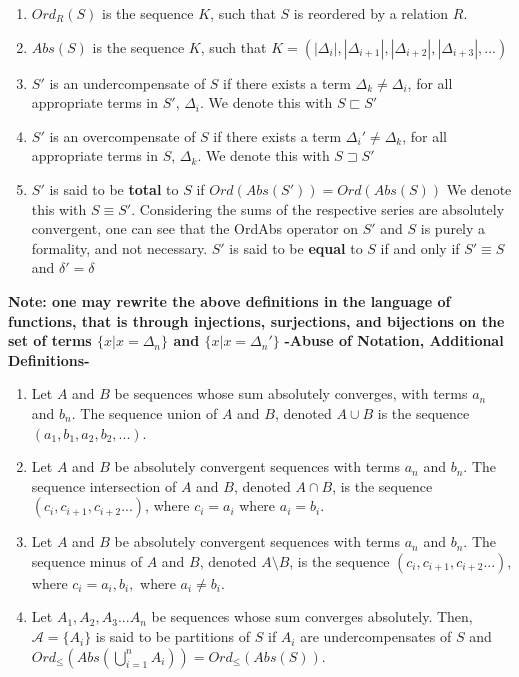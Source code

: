 \documentclass{article}
\begin{document}
\begin{enumerate}[i]
    \item $Ord_R(S)$ is the sequence $K$, such that $S$ is reordered by a relation $R$.
    \item $Abs(S)$ is the sequence $K$, such that $K = (|\Delta_i|,|\Delta_{i+1}|,|\Delta_{i+2}|,|\Delta_{i+3}|,... )$
    \item $S'$ is an undercompensate of $S$ if there exists a term $\Delta_k \neq \Delta_i$, for all appropriate terms in $S'$, 
          $\Delta_i$. We denote this with $S \sqsubset S'$
    \item $S'$ is an overcompensate of $S$ if there exists a term $\Delta_i' \neq \Delta_k$, for all appropriate terms in $S$, 
          $\Delta_k$. We denote this with $S \sqsupset S'$
    \item $S'$ is said to be \textbf{total} to $S$ if $Ord(Abs(S')) = Ord(Abs(S))$ We denote this with $S \equiv S'$. 
          Considering the sums of the respective series are absolutely convergent, one can see that the OrdAbs 
          operator on $S'$ and $S$ is purely a formality, and not necessary. $S'$ is said to be \textbf{equal} to $S$ 
          if and only if $S' \equiv S$ and $\delta' = \delta$
  \end{enumerate}
\textbf{Note:  one may rewrite the above definitions in the language of functions, that is through injections, 
surjections, and bijections on the set of terms $\{x | x = \Delta_n\}$ and $\{x | x = \Delta_n'\}$}
\newpage
\textbf{-Abuse of Notation, Additional Definitions-}
\begin{enumerate}[i]
    \item Let $A$ and $B$ be sequences whose sum absolutely converges, with terms $a_n$ and $b_n$. 
          The sequence union of $A$ and $B$, denoted $A \cup B$ is the sequence $(a_1, b_1, a_2, b_2, ...)$. 
    \item Let $A$ and $B$ be absolutely convergent sequences with terms $a_n$ and $b_n$.  
          The sequence intersection of $A$ and $B$, denoted $A \cap B$, is the sequence $(c_i, c_{i+1}, c_{i+2}...)$, 
          where $c_i = a_i$ where $a_i = b_i$.
    \item Let $A$ and $B$ be absolutely convergent sequences with terms $a_n$ and $b_n$.  
          The sequence minus of $A$ and $B$, denoted $A \setminus B$, is the sequence $(c_i, c_{i+1}, c_{i+2}...)$, 
          where $c_i = a_i, b_i,$ where $a_i \neq b_i$.
    \item Let $A_1, A_2, A_3... A_n$ be sequences whose sum converges absolutely. Then, $\mathcal{A} = \{A_i\}$ 
          is said to be partitions of $S$ if $A_i$ are undercompensates of $S$ and 
          $Ord_{\leq}(Abs(\bigcup\limits_{i=1}^{n} A_{i})) = Ord_{\leq}(Abs(S))$.
\end{enumerate}
\end{document}
